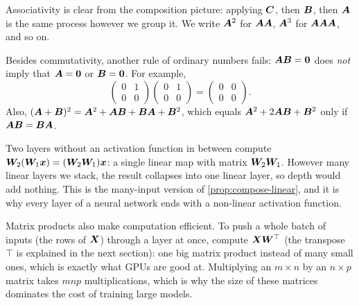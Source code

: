 Associativity is clear from the composition picture: applying $\bm{C}$, then
$\bm{B}$, then $\bm{A}$ is the same process however we group it. We write $\bm{A}^2$
for $\bm{A}\bm{A}$, $\bm{A}^3$ for $\bm{A}\bm{A}\bm{A}$, and so on.

\begin{pitfall}
Besides commutativity, another rule of ordinary numbers fails: $\bm{A}\bm{B} = \bm{0}$
does \emph{not} imply that $\bm{A} = \bm{0}$ or $\bm{B} = \bm{0}$. For example,
\[
  \begin{pmatrix} 0 & 1\\ 0 & 0\end{pmatrix}
  \begin{pmatrix} 0 & 1\\ 0 & 0\end{pmatrix}
  = \begin{pmatrix} 0 & 0\\ 0 & 0\end{pmatrix}.
\]
Also, $(\bm{A} + \bm{B})^2 = \bm{A}^2 + \bm{A}\bm{B} + \bm{B}\bm{A} + \bm{B}^2$, which equals
$\bm{A}^2 + 2\bm{A}\bm{B} + \bm{B}^2$ only if $\bm{A}\bm{B} = \bm{B}\bm{A}$.
\end{pitfall}

\begin{mlnote}
Two layers without an activation function in between compute
$\bm{W}_2(\bm{W}_1\bm{x}) = (\bm{W}_2\bm{W}_1)\bm{x}$: a single linear map with matrix
$\bm{W}_2\bm{W}_1$. However many linear layers we stack, the result collapses into
one linear layer, so depth would add nothing. This is the many-input version of
\cref{prop:compose-linear}, and it is why every layer of a neural network ends
with a non-linear activation function.

Matrix products also make computation efficient. To push a whole batch of
inputs (the rows of $\bm{X}$) through a layer at once, compute $\bm{X}\bm{W}^\top$ (the
transpose $\top$ is explained in the next section): one big matrix product
instead of many small ones, which is exactly what GPUs are good at. Multiplying
an $m\times n$ by an $n\times p$ matrix takes $mnp$ multiplications, which is
why the size of these matrices dominates the cost of training large models.
\end{mlnote}

\sectionexercises

